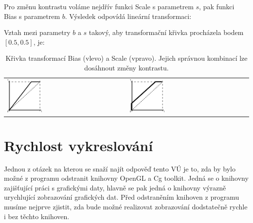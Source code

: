 Pro změnu kontrastu voláme nejdřív funkci Scale s parametrem $s$, pak funkci Bias s parametrem $b$. Výsledek odpovídá lineární transformaci:
 

Vztah mezi parametry $b$ a $s$ takový, aby transformační křivka procházela bodem $[0.5,0.5]$, je:


\noindent
\begin{table}[ht]
	\label{biasscale}
	\centering
		\begin{tabular}{p{}p{}}
			\includegraphics[width=0.3\textwidth]{Text/IMG/Bias.png}
		&
			\includegraphics[width=0.3\textwidth]{Text/IMG/Scale.png}
		\end{tabular}
	\caption{Křivka transformací Bias (vlevo) a Scale (vpravo). Jejich správnou kombinací lze dosáhnout změny kontrastu.}
\end{table}

\section{Rychlost vykreslování}
Jednou z otázek na kterou se snaží najít odpověď tento VÚ je to, zda by bylo možné z programu odstranit knihovny OpenGL a Cg toolkit. Jedná se o knihovny zajišťující práci s grafickými daty, hlavně se pak jedná o knihovny výrazně urychlující zobrazování grafických dat. Před odstraněním knihoven z programu musíme nejprve zjistit, zda bude možné realizovat zobrazování dodstatečně rychle i bez těchto knihoven. 

